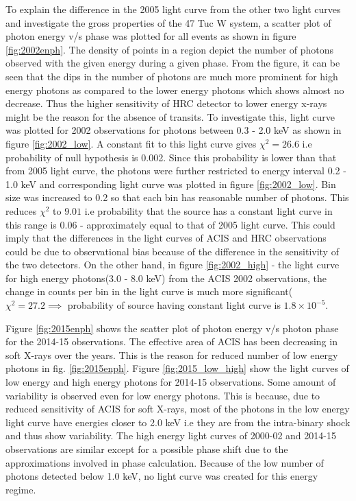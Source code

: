 \documentclass[a4paper,fleqn,usenatbib]{mnras}
\begin{document}
To explain the difference in the 2005 light curve from the other two light curves and investigate the gross properties of the 47 Tuc W 
system, a scatter plot of photon energy v/s phase was plotted for all events as shown in figure \ref{fig:2002enph}. The density of 
points in a region depict the number of photons observed with the given energy during  a given phase. From the figure, it can be seen 
that the dips in the number of photons are much more prominent for high energy photons as compared to the lower energy photons which
shows almost no decrease. Thus the higher sensitivity of HRC detector to lower energy x-rays might be the reason for the 
absence of transits. To investigate this, light curve was plotted for  2002 observations for photons between 0.3 - 2.0 keV as shown
in figure \ref{fig:2002_low}. A constant fit to this light curve gives $\chi^2 = 26.6$ i.e probability of null hypothesis is 0.002. Since this probability is lower than that from 2005 light curve, the photons were further restricted
to energy interval 0.2 - 1.0 keV and corresponding light curve was plotted in figure \ref{fig:2002_low}. Bin size was increased to 0.2 so that each bin has reasonable number of photons. This reduces $\chi^2$ to $9.01$ i.e probability that the source has a constant light curve in this range is $0.06$ - approximately equal to that of 2005 light curve.
This could imply that the differences in the light curves of ACIS and HRC 
observations could be due to observational bias because of the difference in the sensitivity of the two detectors. On the other hand, 
in figure \ref{fig:2002_high} - the light curve for high energy photons(3.0 - 8.0 keV) from the ACIS 2002 observations, the change in 
counts per bin in the light curve is much more significant($\chi^2 = 27.2 \implies$ probability of source having constant light curve is $1.8 \times 10^{-5}$.

Figure \ref{fig:2015enph} shows the scatter plot of photon energy v/s photon phase for the 2014-15 observations. The effective area of ACIS has been decreasing in soft X-rays over the years. This is the reason for reduced number of low energy photons in fig. \ref{fig:2015enph}. Figure \ref{fig:2015_low_high} show the light curves of low energy and high energy photons for 2014-15 observations. Some amount of variability is observed even for low energy photons. This is because, due to reduced sensitivity of ACIS for soft X-rays, most of the photons in the low energy light curve have energies closer to 2.0 keV i.e they are from the intra-binary shock and thus show variability. The high energy light curves of 2000-02 and 2014-15 observations are similar except for a possible phase shift due to the approximations involved in phase calculation. Because of the low number of photons detected below 1.0 keV, no light curve was created for this energy regime. 
\end{document}
